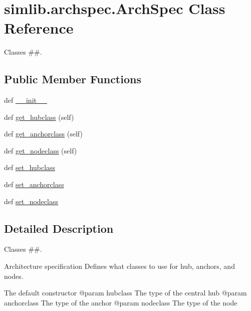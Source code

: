 \hypertarget{classsimlib_1_1archspec_1_1_arch_spec}{}\section{simlib.\+archspec.\+Arch\+Spec Class Reference}
\label{classsimlib_1_1archspec_1_1_arch_spec}


Classes \#\#.  


\subsection*{Public Member Functions}
\begin{DoxyCompactItemize}
\item 
def \mbox{\hyperlink{classsimlib_1_1archspec_1_1_arch_spec_a6632a5eed5f33524fa2a6a51a4f01274}{\+\_\+\+\_\+init\+\_\+\+\_\+}}
\item 
def \mbox{\hyperlink{classsimlib_1_1archspec_1_1_arch_spec_a630555d33bafc4fda4e3ef4a4a856b13}{get\+\_\+hubclass}} (self)
\item 
def \mbox{\hyperlink{classsimlib_1_1archspec_1_1_arch_spec_aca0be1948149b2a220106d5bb4bc3c56}{get\+\_\+anchorclass}} (self)
\item 
def \mbox{\hyperlink{classsimlib_1_1archspec_1_1_arch_spec_a731ef67f540e5961937ccda28babfe21}{get\+\_\+nodeclass}} (self)
\item 
def \mbox{\hyperlink{classsimlib_1_1archspec_1_1_arch_spec_a5419a0d3b27b4864a9cea18f3f42ec2f}{set\+\_\+hubclass}}
\item 
def \mbox{\hyperlink{classsimlib_1_1archspec_1_1_arch_spec_afb99f1d749346f5336ecdd6ff9d1cce6}{set\+\_\+anchorclass}}
\item 
def \mbox{\hyperlink{classsimlib_1_1archspec_1_1_arch_spec_a083a2500010362bcd18101dcf1cc6e6d}{set\+\_\+nodeclass}}
\end{DoxyCompactItemize}


\subsection{Detailed Description}
Classes \#\#. 

\begin{DoxyVerb}Architecture specification
Defines what classes to use for hub, anchors, and nodes.
\end{DoxyVerb}
 \begin{DoxyVerb}The default constructor
@param hubclass The type of the central hub
@param anchorclass The type of the anchor
@param nodeclass The type of the node
\end{DoxyVerb}
 


